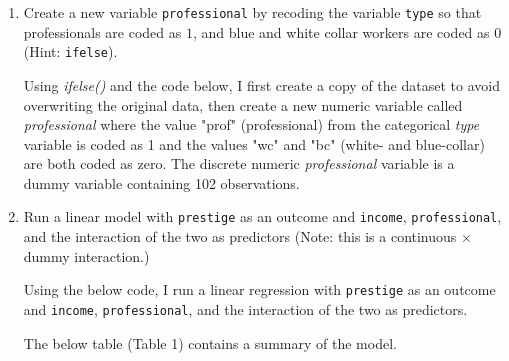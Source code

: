 \documentclass[12pt,letterpaper]{article}
\begin{document}
\newpage
\begin{enumerate}
	
	\item [(a)]
	Create a new variable \texttt{professional} by recoding the variable \texttt{type} so that professionals are coded as $1$, and blue and white collar workers are coded as $0$ (Hint: \texttt{ifelse}). 	\vspace{.5cm}
	
	Using \textit{ifelse()} and the code below, I first create a copy of the dataset to avoid overwriting the original data, then create a new numeric variable called \textit{professional} where the value "prof" (professional) from the categorical \textit{type} variable is coded as 1 and the values "wc" and "bc" (white- and blue-collar) are both coded as zero. The discrete numeric \textit{professional} variable is a dummy variable containing 102 observations. 
	
	 
	
	\vspace{6cm}
	
	
	\item [(b)]
	Run a linear model with \texttt{prestige} as an outcome and \texttt{income}, \texttt{professional}, and the interaction of the two as predictors (Note: this is a continuous $\times$ dummy interaction.) \vspace{.5cm}
	
	Using the below code, I run a linear regression with \texttt{prestige} as an outcome and \texttt{income}, \texttt{professional}, and the interaction of the two as predictors.
	
		 
	
	The below table (Table 1) contains a summary of the model.
		

\end{enumerate}
\end{document}

